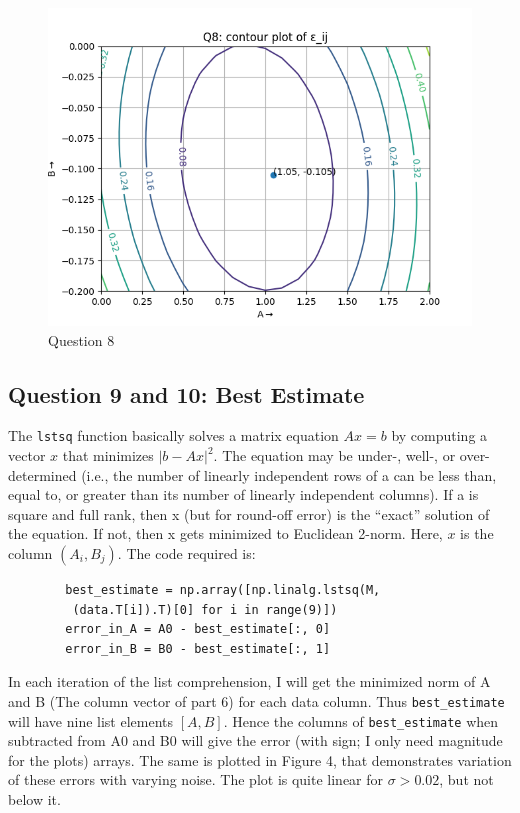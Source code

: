 \documentclass[11pt, a4paper]{article}
\begin{document}
    \begin{figure}[!tbh]
   	\centering
   	\includegraphics[scale=0.5]{Q8.png} 
	\caption{Question 8}
   	\label{fig:Q8}
   \end{figure}
    
   \subsection{Question 9 and 10: Best Estimate}
   The \texttt{lstsq} function basically solves a matrix equation $Ax=b$ by computing a vector $x$ that minimizes $|b-Ax|^2$. The equation may be under-, well-, or over-determined (i.e., the number of linearly independent rows of a can be less than, equal to, or greater than its number of linearly independent columns). If a is square and full rank, then x (but for round-off error) is the “exact” solution of the equation. If not, then x gets minimized to Euclidean 2-norm. Here, $x$ is the column $(A_{i}, B_{j})$. The code required is:

    \begin{verbatim}
		best_estimate = np.array([np.linalg.lstsq(M,
		 (data.T[i]).T)[0] for i in range(9)])
		error_in_A = A0 - best_estimate[:, 0]
		error_in_B = B0 - best_estimate[:, 1]
    \end{verbatim}

In each iteration of the list comprehension, I will get the minimized norm of A and B (The column vector of part 6) for each data column. Thus \texttt{best\_estimate} will have nine list elements $[A, B]$. Hence the columns of \texttt{best\_estimate} when subtracted from A0 and B0 will give the error (with sign; I only need magnitude for the plots) arrays. The same is plotted in Figure 4, that demonstrates variation of these errors with varying noise. The plot is quite linear for $\sigma > 0.02$, but not below it. 
    
\end{document}
